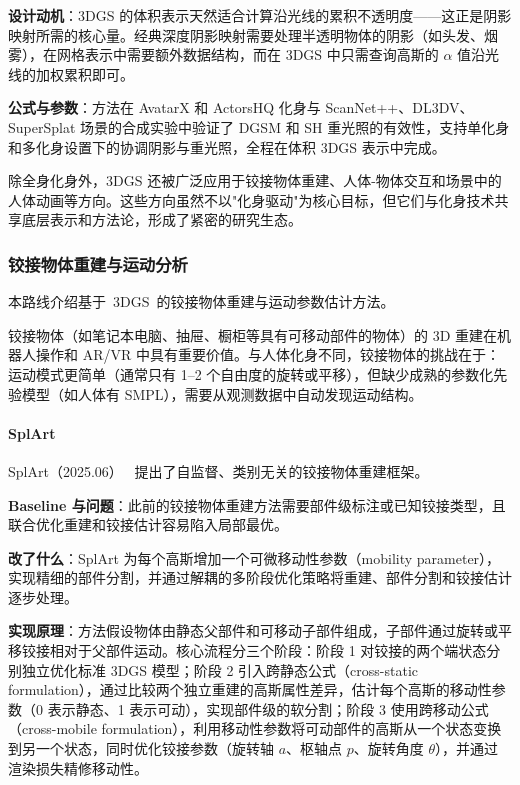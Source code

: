 \textbf{设计动机}：3DGS 的体积表示天然适合计算沿光线的累积不透明度——这正是阴影映射所需的核心量。经典深度阴影映射需要处理半透明物体的阴影（如头发、烟雾），在网格表示中需要额外数据结构，而在 3DGS 中只需查询高斯的 $\alpha$ 值沿光线的加权累积即可。

\textbf{公式与参数}：方法在 AvatarX 和 ActorsHQ 化身与 ScanNet++、DL3DV、SuperSplat 场景的合成实验中验证了 DGSM 和 SH 重光照的有效性，支持单化身和多化身设置下的协调阴影与重光照，全程在体积 3DGS 表示中完成。

除全身化身外，3DGS 还被广泛应用于铰接物体重建、人体-物体交互和场景中的人体动画等方向。这些方向虽然不以"化身驱动"为核心目标，但它们与化身技术共享底层表示和方法论，形成了紧密的研究生态。

\subsubsection{铰接物体重建与运动分析}

本路线介绍基于~3DGS~的铰接物体重建与运动参数估计方法。

铰接物体（如笔记本电脑、抽屉、橱柜等具有可移动部件的物体）的 3D 重建在机器人操作和 AR/VR 中具有重要价值。与人体化身不同，铰接物体的挑战在于：运动模式更简单（通常只有 1--2 个自由度的旋转或平移），但缺少成熟的参数化先验模型（如人体有 SMPL），需要从观测数据中自动发现运动结构。

\paragraph{SplArt}

SplArt（2025.06）~\cite{2506_03594} 提出了自监督、类别无关的铰接物体重建框架。

\textbf{Baseline 与问题}：此前的铰接物体重建方法需要部件级标注或已知铰接类型，且联合优化重建和铰接估计容易陷入局部最优。

\textbf{改了什么}：SplArt 为每个高斯增加一个可微移动性参数（mobility parameter），实现精细的部件分割，并通过解耦的多阶段优化策略将重建、部件分割和铰接估计逐步处理。

\textbf{实现原理}：方法假设物体由静态父部件和可移动子部件组成，子部件通过旋转或平移铰接相对于父部件运动。核心流程分三个阶段：阶段 1 对铰接的两个端状态分别独立优化标准 3DGS 模型；阶段 2 引入跨静态公式（cross-static formulation），通过比较两个独立重建的高斯属性差异，估计每个高斯的移动性参数（0 表示静态、1 表示可动），实现部件级的软分割；阶段 3 使用跨移动公式（cross-mobile formulation），利用移动性参数将可动部件的高斯从一个状态变换到另一个状态，同时优化铰接参数（旋转轴 $a$、枢轴点 $p$、旋转角度 $\theta$），并通过渲染损失精修移动性。

